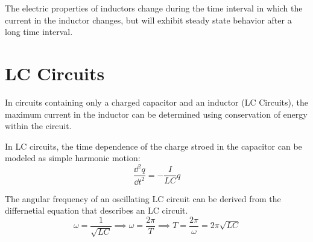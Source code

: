 \documentclass[../em.tex]{subfiles}
\begin{document}
The electric properties of inductors change during the time interval in which the current in the inductor changes, but will 
exhibit steady state behavior after a long time interval.

\section{LC Circuits}
In circuits containing only a charged capacitor and an inductor (LC Circuits), the maximum current in the inductor 
can be determined using conservation of energy within the circuit.

In LC circuits, the time dependence of the charge stroed in the capacitor can be modeled as simple harmonic motion:
\[ \frac{\dd^2 q}{\dd t^2} = -\frac{I}{LC}q \]

The angular frequency of an oscillating LC circuit can be derived from the differnetial equation that describes an LC circuit.
\[ \omega = \frac{1}{\sqrt{LC}} \implies \omega = \frac{2\pi}{T} \implies T = \frac{2\pi}{\omega} = 2\pi\sqrt{LC}\]
\end{document}
